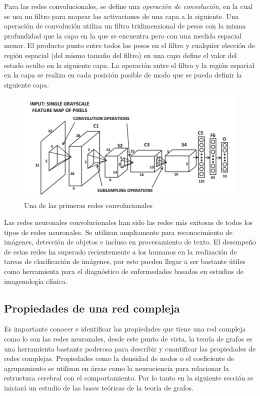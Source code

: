 Para las redes convolucionales, se define una \textit{operación de convolución}, en la cual se usa un filtro para mapear las activaciones de una capa a la siguiente. Una operación de convolución utiliza un filtro tridimensional de pesos con la misma profundidad que la capa en la que se encuentra pero con una medida espacial menor. El producto punto entre todos los pesos en el filtro y cualquier elección de región espacial (del mismo tamaño del filtro) en una capa define el valor del estado oculto en la siguiente capa. La operación entre el filtro y la región espacial en la capa se realiza en cada posición posible de modo que se pueda definir la siguiente capa.

\begin{figure}[h!] %
		\centering	
		\includegraphics[scale=1]{redconvolucional.png}
		\caption{Una de las primeras redes convolucionales}
\end{figure}

Las redes neuronales convolucionales han sido las redes más exitosas de todos los tipos de redes neuronales. Se utilizan ampliamente para reconocimiento de imágenes, detección de objetos e incluso en procesamiento de texto. El desempeño de estas redes ha superado recientemente a los humanos en la realización de tareas de clasificación de imágenes, por esto pueden llegar a ser bastante útiles como herramienta para el diagnóstico de enfermedades basados en estudios de imagenología clínica. 

\subsection{Propiedades de una red compleja}

Es importante conocer e identificar las propiedades que tiene una red compleja como lo son las redes neuronales, desde este punto de vista, la teoría de grafos es una herramienta bastante poderosa para describir y cuantificar las propiedades de redes complejas. Propiedades como la densidad de nodos o el coeficiente de agrupamiento se utilizan en áreas como la neurociencia para relacionar la estructura cerebral con el comportamiento. Por lo tanto en la siguiente sección se iniciará un estudio de las bases teóricas de la teoría de grafos. 
